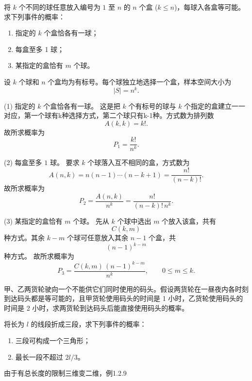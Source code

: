\begin{exercise}
将 $k$ 个不同的球任意放入编号为 $1$ 至 $n$ 的 $n$ 个盒 ($k \leq n$)，每球入各盒等可能。求下列事件的概率：
\begin{enumerate}
  \item 指定的 $k$ 个盒恰各有一球；
  \item 每盒至多 1 球；
  \item 某指定的盒恰有 $m$ 个球。
\end{enumerate}
\end{exercise}
\begin{proposition}
    \begin{solution}
设 $k$ 个球和 $n$ 个盒均为有标号。每个球独立地选择一个盒，样本空间大小为
\[
|S| = n^k.
\]

\noindent (1) 指定的 $k$ 个盒恰各有一球。  
这是把 $k$ 个有标号的球与 $k$ 个指定的盒建立一一对应，第一个球有k种选择方式，第二个球只有k-1种。方式数为排列数
\[
A(k,k) = k!.
\]
故所求概率为
\[
P_1 = \frac{k!}{n^k}.
\]

\noindent (2) 每盒至多 $1$ 球。  
要求 $k$ 个球落入互不相同的盒，方式数为
\[
A(n,k) = n(n-1)\cdots(n-k+1) = \frac{n!}{(n-k)!}.
\]
故所求概率为
\[
P_2 = \frac{A(n,k)}{n^k} = \frac{n!}{(n-k)!\,n^k}.
\]

\noindent (3) 某指定的盒恰有 $m$ 个球。  
先从 $k$ 个球中选出 $m$ 个放入该盒，共有
\[
C(k,m)
\]
种方式。其余 $k-m$ 个球可任意放入其余 $n-1$ 个盒，共
\[
(n-1)^{k-m}
\]
种方式。  
故所求概率为
\[
P_3 = \frac{C(k,m)\,(n-1)^{k-m}}{n^k}, \qquad 0 \le m \le k.
\]
\end{solution}
\end{proposition}

\begin{exercise}
甲、乙两货轮驶向一个不能供它们同时使用的码头。假设两货轮在一昼夜内各时刻到达码头都是等可能的，且甲货轮使用码头的时间是 1 小时，乙货轮使用码头的时间是 2 小时，求两货轮到达码头后能直接使用码头的概率。
\end{exercise}
\begin{exercise}
将长为 $l$ 的线段折成三段，求下列事件的概率：
\begin{enumerate}
  \item 三段可构成一个三角形；
  \item 最长一段不超过 $2l/3$。
\end{enumerate}
\end{exercise}
\begin{dxtips}
    由于有总长度的限制三维变二维，例1.2.9
\end{dxtips}

